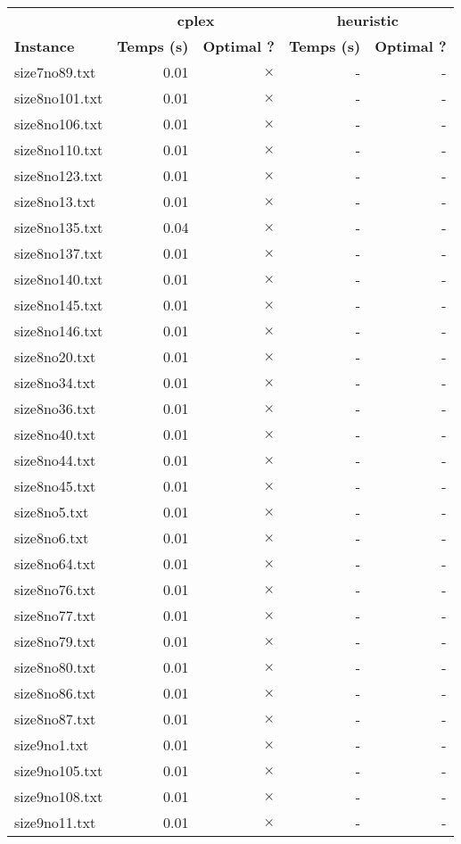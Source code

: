 \documentclass{article}
\begin{document}
\newpage
\begin{center}
\renewcommand{\arraystretch}{1.4} 
 \begin{tabular}{lrrrr}
	\hline
 & \multicolumn{2}{c}{\textbf{cplex}} & \multicolumn{2}{c}{\textbf{heuristic}}\\
\textbf{Instance}  & \textbf{Temps (s)} & \textbf{Optimal ?}  & \textbf{Temps (s)} & \textbf{Optimal ?} \\\hline

size7no89.txt & 0.01 & 
$\times$
 & - & - 
\\
size8no101.txt & 0.01 & 
$\times$
 & - & - 
\\
size8no106.txt & 0.01 & 
$\times$
 & - & - 
\\
size8no110.txt & 0.01 & 
$\times$
 & - & - 
\\
size8no123.txt & 0.01 & 
$\times$
 & - & - 
\\
size8no13.txt & 0.01 & 
$\times$
 & - & - 
\\
size8no135.txt & 0.04 & 
$\times$
 & - & - 
\\
size8no137.txt & 0.01 & 
$\times$
 & - & - 
\\
size8no140.txt & 0.01 & 
$\times$
 & - & - 
\\
size8no145.txt & 0.01 & 
$\times$
 & - & - 
\\
size8no146.txt & 0.01 & 
$\times$
 & - & - 
\\
size8no20.txt & 0.01 & 
$\times$
 & - & - 
\\
size8no34.txt & 0.01 & 
$\times$
 & - & - 
\\
size8no36.txt & 0.01 & 
$\times$
 & - & - 
\\
size8no40.txt & 0.01 & 
$\times$
 & - & - 
\\
size8no44.txt & 0.01 & 
$\times$
 & - & - 
\\
size8no45.txt & 0.01 & 
$\times$
 & - & - 
\\
size8no5.txt & 0.01 & 
$\times$
 & - & - 
\\
size8no6.txt & 0.01 & 
$\times$
 & - & - 
\\
size8no64.txt & 0.01 & 
$\times$
 & - & - 
\\
size8no76.txt & 0.01 & 
$\times$
 & - & - 
\\
size8no77.txt & 0.01 & 
$\times$
 & - & - 
\\
size8no79.txt & 0.01 & 
$\times$
 & - & - 
\\
size8no80.txt & 0.01 & 
$\times$
 & - & - 
\\
size8no86.txt & 0.01 & 
$\times$
 & - & - 
\\
size8no87.txt & 0.01 & 
$\times$
 & - & - 
\\
size9no1.txt & 0.01 & 
$\times$
 & - & - 
\\
size9no105.txt & 0.01 & 
$\times$
 & - & - 
\\
size9no108.txt & 0.01 & 
$\times$
 & - & - 
\\
size9no11.txt & 0.01 & 
$\times$
 & - & - 
\\
\hline\end{tabular}
\end{center}
\end{document}

